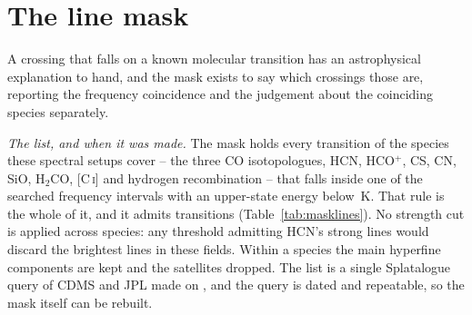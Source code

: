 \section{The line mask}
\label{app:linemask}

A crossing that falls on a known molecular transition has an astrophysical
explanation to hand, and the mask exists to say which crossings those are,
reporting the frequency coincidence and the judgement about the coinciding
species separately.

\emph{The list, and when it was made.} The mask holds every transition of the
\FrNSpec{} species these spectral setups cover -- the three CO isotopologues,
HCN, HCO$^{+}$, CS, CN, SiO, H$_2$CO, [C\,\textsc{i}] and hydrogen
recombination -- that falls inside one of the \McNIsland{} searched frequency
intervals with an upper-state energy below \McEuMax\,K. That rule is the whole
of it, and it admits \FrNTrans{} transitions (Table~\ref{tab:masklines}).
No strength cut is applied across species: any threshold admitting HCN's
strong lines would discard the brightest lines in these fields. Within a
species the main hyperfine components are kept and the satellites
dropped. The list is a single Splatalogue query
\citep{Splatalogue2007} of CDMS and JPL \citep{Pickett1998,CDMS2005} made on
\MkListDate{}, and the query is dated and repeatable, so the mask itself can
be rebuilt.


